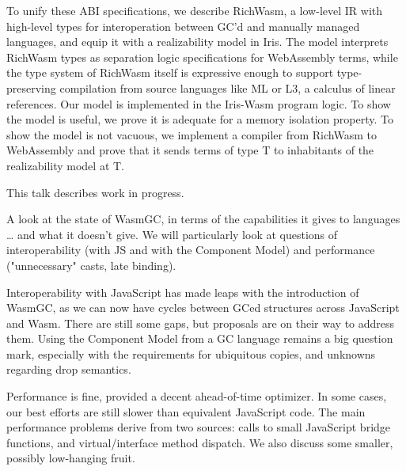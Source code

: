 \documentclass[a4paper,UKenglish]{dagrep-v2018}
\begin{document}
To unify these ABI specifications, we describe RichWasm, a low-level IR with high-level types for interoperation between GC'd and manually managed languages, and equip it with a realizability model in Iris. The model interprets RichWasm types as separation logic specifications for WebAssembly terms, while the type system of RichWasm itself is expressive enough to support type-preserving compilation from source languages like ML or L3, a calculus of linear references. Our model is implemented in the Iris-Wasm program logic. To show the model is useful, we prove it is adequate for a memory isolation property. To show the model is not vacuous, we implement a compiler from RichWasm to WebAssembly and prove that it sends terms of type T to inhabitants of the realizability model at T.

This talk describes work in progress.

\license
{}

A look at the state of WasmGC, in terms of the capabilities it gives to languages … and what it doesn't give. We will particularly look at questions of interoperability (with JS and with the Component Model) and performance ("unnecessary" casts, late binding).

Interoperability with JavaScript has made leaps with the introduction of WasmGC, as we can now have cycles between GCed structures across JavaScript and Wasm. There are still some gaps, but proposals are on their way to address them. Using the Component Model from a GC language remains a big question mark, especially with the requirements for ubiquitous copies, and unknowns regarding drop semantics.

Performance is fine, provided a decent ahead-of-time optimizer. In some cases, our best efforts are still slower than equivalent JavaScript code. The main performance problems derive from two sources: calls to small JavaScript bridge functions, and virtual/interface method dispatch. We also discuss some smaller, possibly low-hanging fruit.

\license
{}
\end{document}
